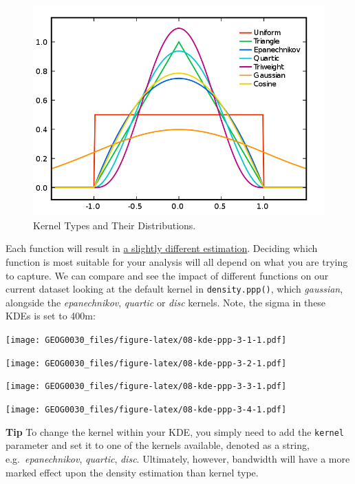 \documentclass[
]{book}
\begin{document}
\begin{figure}

{\centering \includegraphics[width=650pt]{images/w08/kerneltypes} 

}

\caption{Kernel Types and Their Distributions.}\label{fig:08-kernels}
\end{figure}

Each function will result in \href{https://nij.ojp.gov/sites/g/files/xyckuh171/files/media/document/CrimeStat\%2520IV\%2520Chapter\%252010.pdf}{a slightly different estimation}. Deciding which function is most suitable for your analysis will all depend on what you are trying to capture. We can compare and see the impact of different functions on our current dataset looking at the default kernel in \texttt{density.ppp()}, which \emph{gaussian}, alongside the \emph{epanechnikov}, \emph{quartic} or \emph{disc} kernels. Note, the sigma in these KDEs is set to 400m:

\texttt{[image: GEOG0030\_files/figure-latex/08-kde-ppp-3-1-1.pdf]}

\texttt{[image: GEOG0030\_files/figure-latex/08-kde-ppp-3-2-1.pdf]}

\texttt{[image: GEOG0030\_files/figure-latex/08-kde-ppp-3-3-1.pdf]}

\texttt{[image: GEOG0030\_files/figure-latex/08-kde-ppp-3-4-1.pdf]}

\textbf{Tip}
To change the kernel within your KDE, you simply need to add the \texttt{kernel} parameter and set it to one of the kernels available, denoted as a string, e.g.~\emph{epanechnikov}, \emph{quartic}, \emph{disc}. Ultimately, however, bandwidth will have a more marked effect upon the density estimation than kernel type.
\end{document}
